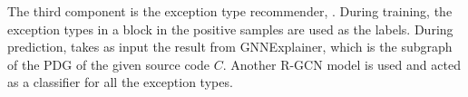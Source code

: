 The third component is the exception type recommender, {\xtype}.
During training, the exception types in a  block in
the positive samples are used as the labels. During prediction,
{\xtype} takes as input the result from GNNExplainer, which is the
subgraph of the PDG of the given source code $C$. Another R-GCN model
is used and acted as a classifier for all the exception
types.
